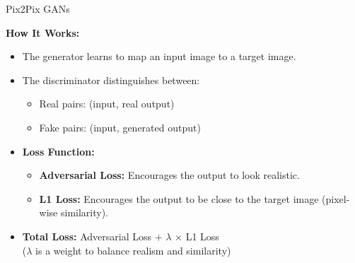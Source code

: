 \begin{frame}[allowframebreaks]{Pix2Pix GANs}
    \begin{figure}
        \centering
    \end{figure}

    \textbf{How It Works:}
    \begin{itemize}
        \item The generator learns to map an input image to a target image.
        \item The discriminator distinguishes between:
        \begin{itemize}
            \item Real pairs: (input, real output)
            \item Fake pairs: (input, generated output)
        \end{itemize}
        \item \textbf{Loss Function:}
        \begin{itemize}
            \item \textbf{Adversarial Loss:} Encourages the output to look realistic.
            \item \textbf{L1 Loss:} Encourages the output to be close to the target image (pixel-wise similarity).
        \end{itemize}
        \item \textbf{Total Loss:} Adversarial Loss $+$ $\lambda$ $\times$ L1 Loss \\
        ($\lambda$ is a weight to balance realism and similarity)
    \end{itemize}
\framebreak
    \begin{figure}
        \centering
    \end{figure}
\end{frame}

